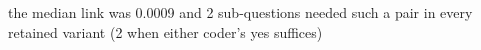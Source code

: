 the median link was 0.0009 and 2 sub-questions needed such a pair in every retained variant (2 when either coder's yes suffices)